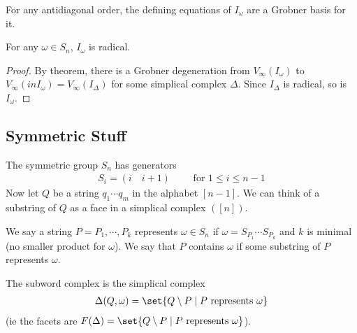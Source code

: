 \begin{theorem}
    For any antidiagonal order, the defining equations of $I_\omega$ are a Grobner basis for it.
\end{theorem}

\begin{corollary}
    For any $\omega \in S_n$, $I_\omega$ is radical.
\end{corollary}

\begin{proof}
    By theorem, there is a Grobner degeneration from $V_\infty (I_\omega) $ to $V_\infty (in I_\omega) = V_\infty (I_\Delta) $ for some simplical complex $\Delta$. Since $I_\Delta$ is radical, so is $I_\omega$.
\end{proof}

\subsection{Symmetric Stuff}

The symmetric group $S_n$ has generators
\begin{align*}
    S_i = (i \quad i+1 ) \qquad \text{ for } 1 \leq i \leq n-1 
\end{align*}
Now let $Q$ be a string $q_1 \cdots q_m$ in the alphabet $[n-1]$. We can think of a substring of $Q$ as a face in a simplical complex $([n])$.

\begin{definition}
    We say a string $P = P_1 , \cdots , P_k$ represents $\omega \in S_n$ if $\omega = S_{P_1} \cdots S_{P_k}$ and $k$ is minimal (no smaller product for $\omega$). We say that $P$ contains $\omega$ if some substring of $P $ represents $\omega$.
\end{definition}

\begin{definition}
    The subword complex is the simplical complex
    \begin{align*}
        \Delta (Q, \omega) = \set{Q \setminus P \mid P \text{ represents } \omega}
    \end{align*}
    (ie the facets are $F(\Delta ) = \set{Q \setminus P \mid P \text{ represents } \omega}$).
\end{definition}

